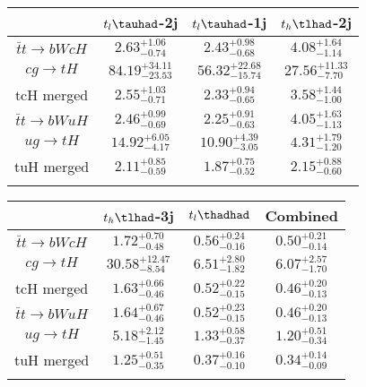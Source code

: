 \centering
\begin{tabular}{|cccc} \toprule\toprule
 & $t_l\tauhad$-2j & $t_l\tauhad$-1j & $t_h\tlhad$-2j\\\midrule
$\bar{t}t\to bWcH$ & $2.63^{+1.06}_{-0.74}$ & $2.43^{+0.98}_{-0.68}$ & $4.08^{+1.64}_{-1.14}$\\
$cg\to tH$ & $84.19^{+34.11}_{-23.53}$ & $56.32^{+22.68}_{-15.74}$ & $27.56^{+11.33}_{-7.70}$\\
tcH merged & $2.55^{+1.03}_{-0.71}$ & $2.33^{+0.94}_{-0.65}$ & $3.58^{+1.44}_{-1.00}$\\
$\bar{t}t\to bWuH$ & $2.46^{+0.99}_{-0.69}$ & $2.25^{+0.91}_{-0.63}$ & $4.05^{+1.63}_{-1.13}$\\
$ug\to tH$ & $14.92^{+6.05}_{-4.17}$ & $10.90^{+4.39}_{-3.05}$ & $4.31^{+1.79}_{-1.20}$\\
tuH merged & $2.11^{+0.85}_{-0.59}$ & $1.87^{+0.75}_{-0.52}$ & $2.15^{+0.88}_{-0.60}$\\
\bottomrule\bottomrule\\
\end{tabular}
\begin{tabular}{|cccc} \toprule\toprule
 & $t_h\tlhad$-3j & $t_l\thadhad$ & Combined\\\midrule
$\bar{t}t\to bWcH$ & $1.72^{+0.70}_{-0.48}$ & $0.56^{+0.24}_{-0.16}$ & $0.50^{+0.21}_{-0.14}$\\
$cg\to tH$ & $30.58^{+12.47}_{-8.54}$ & $6.51^{+2.80}_{-1.82}$ & $6.07^{+2.57}_{-1.70}$\\
tcH merged & $1.63^{+0.66}_{-0.46}$ & $0.52^{+0.22}_{-0.15}$ & $0.46^{+0.20}_{-0.13}$\\
$\bar{t}t\to bWuH$ & $1.64^{+0.67}_{-0.46}$ & $0.52^{+0.23}_{-0.15}$ & $0.46^{+0.20}_{-0.13}$\\
$ug\to tH$ & $5.18^{+2.12}_{-1.45}$ & $1.33^{+0.58}_{-0.37}$ & $1.20^{+0.51}_{-0.34}$\\
tuH merged & $1.25^{+0.51}_{-0.35}$ & $0.37^{+0.16}_{-0.10}$ & $0.34^{+0.14}_{-0.09}$\\
\bottomrule\bottomrule\\
\end{tabular}
